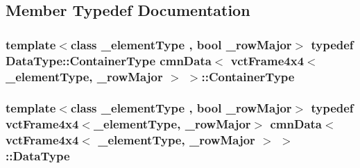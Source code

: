 \subsection{Member Typedef Documentation}
\hypertarget{classcmn_data_3_01vct_frame4x4_3_01__element_type_00_01__row_major_01_4_01_4_ae99fda61ec4aed99e356a16b3fdbf448}{}
\subsubsection[{Container\+Type}]{\setlength{\rightskip}{0pt plus 5cm}template$<$class \+\_\+element\+Type , bool \+\_\+row\+Major$>$ typedef {\bf Data\+Type\+::\+Container\+Type} {\bf cmn\+Data}$<$ {\bf vct\+Frame4x4}$<$ \+\_\+element\+Type, \+\_\+row\+Major $>$ $>$\+::{\bf Container\+Type}}\label{classcmn_data_3_01vct_frame4x4_3_01__element_type_00_01__row_major_01_4_01_4_ae99fda61ec4aed99e356a16b3fdbf448}
\hypertarget{classcmn_data_3_01vct_frame4x4_3_01__element_type_00_01__row_major_01_4_01_4_abf4e17a9d0af654027bedb454326d1d2}{}
\subsubsection[{Data\+Type}]{\setlength{\rightskip}{0pt plus 5cm}template$<$class \+\_\+element\+Type , bool \+\_\+row\+Major$>$ typedef {\bf vct\+Frame4x4}$<$\+\_\+element\+Type, \+\_\+row\+Major$>$ {\bf cmn\+Data}$<$ {\bf vct\+Frame4x4}$<$ \+\_\+element\+Type, \+\_\+row\+Major $>$ $>$\+::{\bf Data\+Type}}\label{classcmn_data_3_01vct_frame4x4_3_01__element_type_00_01__row_major_01_4_01_4_abf4e17a9d0af654027bedb454326d1d2}


